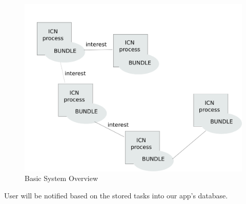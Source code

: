 \documentclass[10pt,a4paper]{report}
\begin{document}
\begin{figure}[h!]
\begin{center}
	\includegraphics[scale=0.25, trim=125 0 50 0]{path4019.png}
	\caption{Basic System Overview}
\end{center}
\end{figure}

User will be notified based on the stored tasks into our app's database. 
\end{document}
